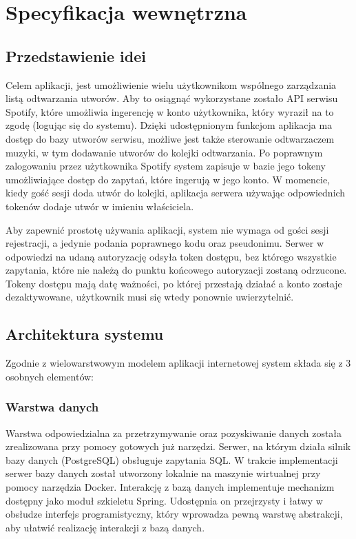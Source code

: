 \chapter{Specyfikacja wewnętrzna}
\label{ch:05}

\section{Przedstawienie idei}
Celem aplikacji, jest umożliwienie wielu użytkownikom wspólnego zarządzania listą odtwarzania utworów. Aby to osiągnąć wykorzystane zostało API serwisu Spotify, które umożliwia ingerencję w konto użytkownika, który wyraził na to zgodę (logując się do systemu). Dzięki udostępnionym funkcjom aplikacja ma dostęp do bazy utworów serwisu, możliwe jest także sterowanie odtwarzaczem muzyki, w tym dodawanie utworów do kolejki odtwarzania. Po poprawnym zalogowaniu przez użytkownika Spotify system zapisuje w bazie jego tokeny umożliwiające dostęp do zapytań, które ingerują w jego konto. W momencie, kiedy gość sesji doda utwór do kolejki, aplikacja serwera używając odpowiednich tokenów dodaje utwór w imieniu właściciela.

Aby zapewnić prostotę używania aplikacji, system nie wymaga od gości sesji rejestracji, a jedynie podania poprawnego kodu oraz pseudonimu. Serwer w odpowiedzi na udaną autoryzację odsyła token dostępu, bez którego wszystkie zapytania, które nie należą do punktu końcowego autoryzacji zostaną odrzucone. Tokeny dostępu mają datę ważności, po której przestają działać a konto zostaje dezaktywowane, użytkownik musi się wtedy ponownie uwierzytelnić.


\section{Architektura systemu}
Zgodnie z wielowarstwowym modelem aplikacji internetowej system składa się z 3 osobnych elementów:
\subsection{Warstwa danych}
Warstwa odpowiedzialna za przetrzymywanie oraz pozyskiwanie danych została zrealizowana przy pomocy gotowych już narzędzi. Serwer, na którym działa silnik bazy danych (PostgreSQL) obsługuje zapytania SQL. W trakcie implementacji serwer bazy danych został utworzony lokalnie na maszynie wirtualnej przy pomocy narzędzia Docker. Interakcję z bazą danych implementuje mechanizm dostępny jako moduł szkieletu Spring. Udostępnia on przejrzysty i łatwy w obsłudze interfejs programistyczny, który wprowadza pewną warstwę abstrakcji, aby ułatwić realizację interakcji z bazą danych.

